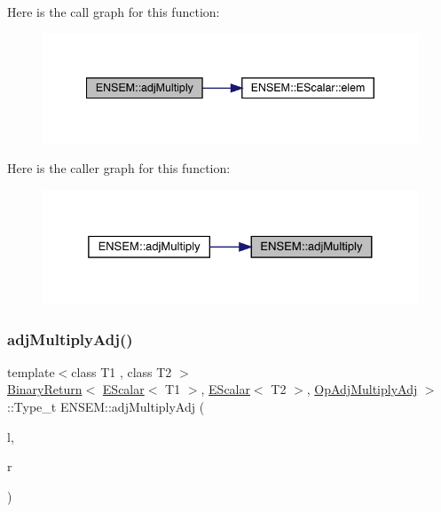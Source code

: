 Here is the call graph for this function\+:\nopagebreak
\begin{figure}[H]
\begin{center}
\leavevmode
\includegraphics[width=340pt]{d4/dca/group__escalar_ga8cef36c4e2779c7d7dbf64b9500b053c_cgraph}
\end{center}
\end{figure}
Here is the caller graph for this function\+:\nopagebreak
\begin{figure}[H]
\begin{center}
\leavevmode
\includegraphics[width=325pt]{d4/dca/group__escalar_ga8cef36c4e2779c7d7dbf64b9500b053c_icgraph}
\end{center}
\end{figure}
\mbox{\label{group__escalar_gab3c0c146aa415c32cb9ce5a6ad426d10}} 
\subsubsection{\texorpdfstring{adjMultiplyAdj()}{adjMultiplyAdj()}}
{\footnotesize\ttfamily template$<$class T1 , class T2 $>$ \\
\mbox{\hyperlink{structENSEM_1_1BinaryReturn}{Binary\+Return}}$<$ \mbox{\hyperlink{classENSEM_1_1EScalar}{E\+Scalar}}$<$ T1 $>$, \mbox{\hyperlink{classENSEM_1_1EScalar}{E\+Scalar}}$<$ T2 $>$, \mbox{\hyperlink{structENSEM_1_1OpAdjMultiplyAdj}{Op\+Adj\+Multiply\+Adj}} $>$\+::Type\+\_\+t E\+N\+S\+E\+M\+::adj\+Multiply\+Adj (\begin{DoxyParamCaption}\item[{const \mbox{\hyperlink{classENSEM_1_1EScalar}{E\+Scalar}}$<$ T1 $>$ \&}]{l,  }\item[{const \mbox{\hyperlink{classENSEM_1_1EScalar}{E\+Scalar}}$<$ T2 $>$ \&}]{r }\end{DoxyParamCaption})\hspace{0.3cm}{\ttfamily [inline]}}

